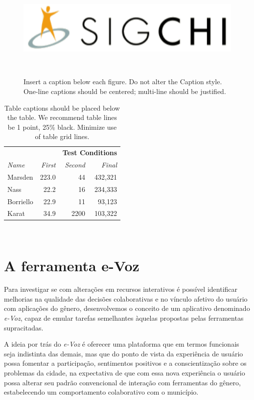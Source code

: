 \documentclass{sigchi}
\begin{document}
\begin{figure}
\centering
  \includegraphics[width=0.9\columnwidth]{figures/sigchi-logo}
  \caption{Insert a caption below each figure. Do not alter the
    Caption style.  One-line captions should be centered; multi-line
    should be justified. }~\label{fig:figure1}
\end{figure}


\begin{table}
  \centering
  \begin{tabular}{l r r r}
    & & \multicolumn{2}{c}{\small{\textbf{Test Conditions}}} \\
    \cmidrule(r){3-4}
    {\small\textit{Name}}
    & {\small \textit{First}}
      & {\small \textit{Second}}
    & {\small \textit{Final}} \\
    \midrule
    Marsden & 223.0 & 44 & 432,321 \\
    Nass & 22.2 & 16 & 234,333 \\
    Borriello & 22.9 & 11 & 93,123 \\
    Karat & 34.9 & 2200 & 103,322 \\
  \end{tabular}
  \caption{Table captions should be placed below the table. We
    recommend table lines be 1 point, 25\% black. Minimize use of
    table grid lines.}~\label{tab:table1}
\end{table}


\section{A ferramenta e-Voz}
Para investigar se com alterações em recursos interativos é possível identificar melhorias na qualidade das decisões colaborativas e no vínculo afetivo do usuário com aplicações do gênero, desenvolvemos o conceito de um aplicativo denominado \textit{e-Voz}, capaz de emular tarefas semelhantes àquelas propostas pelas ferramentas supracitadas.

A ideia por trás do \textit{e-Voz} é oferecer uma plataforma que em termos funcionais seja indistinta das demais, mas que do ponto de vista da experiência de usuário possa fomentar a participação, sentimentos positivos e a conscientização sobre os problemas da cidade, na expectativa de que com essa nova experiência o usuário possa alterar seu padrão convencional de interação com ferramentas do gênero, estabelecendo um comportamento colaborativo com o município.
\end{document}
